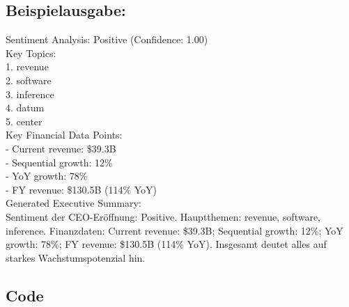 \documentclass[a4paper,12pt]{scrartcl}
\begin{document}
\subsection*{Beispielausgabe:}
Sentiment Analysis: Positive (Confidence: 1.00)\\
\newline
Key Topics:\\
  1. revenue\\
  2. software\\
  3. inference\\
  4. datum\\
  5. center\\
\newline
Key Financial Data Points:\\
  - Current revenue: \$39.3B\\
  - Sequential growth: 12\%\\
  - YoY growth: 78\%\\
  - FY revenue: \$130.5B (114\% YoY)\\
\newline
Generated Executive Summary:\\
Sentiment der CEO-Eröffnung: Positive. Hauptthemen: revenue, software, inference. Finanzdaten: Current revenue: \$39.3B; Sequential growth: 12\%; YoY growth: 78\%; FY revenue: \$130.5B (114\% YoY). Insgesamt deutet alles auf starkes Wachstumspotenzial hin.
\subsection*{Code}
\end{document}
